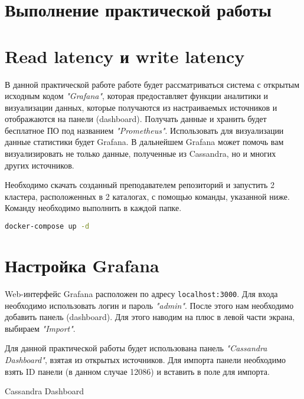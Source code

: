 \section*{\LARGE Выполнение практической работы}

\section{Read latency и write latency}

В данной практической работе работе будет рассматриваться система с
открытым исходным кодом \textit{"Grafana"}, которая предоставляет функции
аналитики и визуализации данных, которые получаются из настраиваемых
источников и отображаются на панели (dashboard). Получать данные и хранить
будет бесплатное ПО под названием \textit{"Prometheus"}. Использовать для
визуализации данные статистики будет Grafana. В дальнейшем Grafana может
помочь вам визуализировать не только данные, полученные из Cassandra, но и
многих других источников.\par
Необходимо скачать созданный преподавателем репозиторий
и запустить 2 кластера, расположенных в 2 каталогах, с
помощью команды, указанной ниже. Команду необходимо выполнить в каждой
папке.

\begin{lstlisting}[language=bash]
docker-compose up -d
\end{lstlisting}

\section{Настройка Grafana}

Web-интерфейс Grafana расположен по адресу \texttt{localhost:3000}.
Для входа необходимо использовать логин и пароль \textit{"admin"}.
После этого нам необходимо добавить панель (dashboard).
Для этого наводим на плюс в левой части экрана, выбираем \textit{"Import"}.\par
Для данной практической работы будет использована панель
\textit{"Cassandra Dashboard"}, взятая из открытых источников.
Для импорта панели необходимо взять ID панели (в данном случае 12086)
и вставить в поле для импорта.

\begin{image}
	\caption{Cassandra Dashboard}
	\label{fig:dashboard:import}
\end{image}

